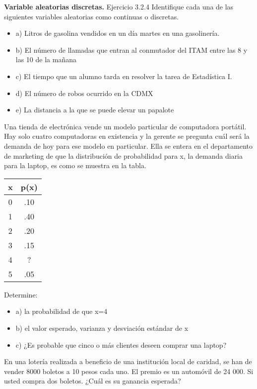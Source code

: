 \documentclass{oxmathproblems}
\begin{document}
\begin{questions}


\miquestion \textbf {Variable aleatorias discretas.}
Ejercicio 3.2.4 Identifique cada una de las siguientes variables aleatorias como continuas o discretas. 
\begin{itemize}
\item  a) Litros de gasolina vendidos en un día martes en una gasolinería. 
\item  b) El número de llamadas que entran al conmutador del ITAM entre las 8 y las 10 de la mañana
\item  c) El tiempo que un alumno tarda en resolver la tarea de Estadística I. 
\item  d) El número de robos ocurrido en la CDMX 
\item  e) La distancia a la que se puede elevar un papalote
\end{itemize}

\miquestion Una tienda de electrónica vende un modelo particular de computadora portátil. Hay solo cuatro computadoras en existencia y la gerente se pregunta cuál será la demanda de hoy para ese modelo en particular. Ella se entera en el departamento de marketing de que la distribución de probabilidad para x, la demanda diaria para la laptop, es como se muestra en la tabla.  

\begin{center}
\begin{tabular}{ |c|c| } 
 \hline
 \textbf{x} & \textbf{p(x)} \\ 
 \hline
 0 & .10 \\
 1  & .40 \\
2 & .20\\ 
 3 & .15 \\ 
4 & ? \\ 
5 & .05 \\ 
 \hline
\end{tabular}
\end{center}
 Determine:   
\begin{itemize}
\item  a) la probabilidad de que x=4
\item  b) el valor esperado, varianza y desviación estándar de x
\item  c) ¿Es probable que cinco o más clientes deseen comprar una laptop?
\end{itemize}


\miquestion En una lotería realizada a beneficio de una institución local de caridad, se han de vender 8000 boletos a 10 pesos cada uno. El premio es un automóvil de 24 000. Si usted compra dos boletos. ¿Cuál es su ganancia esperada?


\end{questions}
\end{document}
